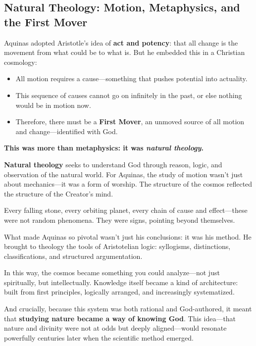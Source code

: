 \subsection{Natural Theology: Motion, Metaphysics, and the First Mover}

Aquinas adopted Aristotle’s idea of \textbf{act and potency}: that all change is the movement from what could be to what is. But he embedded this in a Christian cosmology:

\begin{itemize}
    \item All motion requires a cause—something that pushes potential into actuality.
    \item This sequence of causes cannot go on infinitely in the past, or else nothing would be in motion now.
    \item Therefore, there must be a \textbf{First Mover}, an unmoved source of all motion and change—identified with God.
\end{itemize}

\textbf{This was more than metaphysics: it was \textit{natural theology}.}

\textbf{Natural theology} seeks to understand God through reason, logic, and observation of the natural world. For Aquinas, the study of motion wasn’t just about mechanics—it was a form of worship. The structure of the cosmos reflected the structure of the Creator’s mind.

Every falling stone, every orbiting planet, every chain of cause and effect—these were not random phenomena. They were signs, pointing beyond themselves.

What made Aquinas so pivotal wasn’t just his conclusions: it was his method. He brought to theology the tools of Aristotelian logic: syllogisms, distinctions, classifications, and structured argumentation.  

In this way, the cosmos became something you could analyze—not just spiritually, but intellectually. Knowledge itself became a kind of architecture: built from first principles, logically arranged, and increasingly systematized.

And crucially, because this system was both rational and God-authored, it meant that \textbf{studying nature became a way of knowing God}. This idea—that nature and divinity were not at odds but deeply aligned—would resonate powerfully centuries later when the scientific method emerged.

